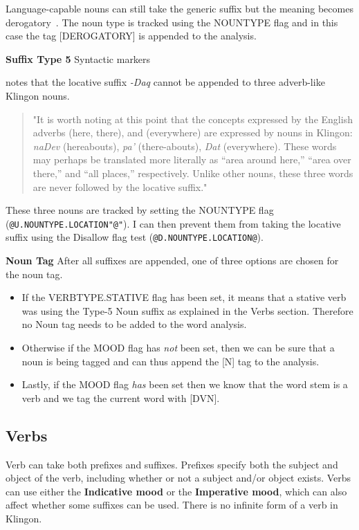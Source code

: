 \documentclass[11pt]{article}
\begin{document}
Language-capable nouns can still take the generic suffix but the meaning becomes derogatory~\cite{Okrand:92}. The noun type is tracked using the NOUNTYPE flag and in this case the tag [DEROGATORY] is appended to the analysis.

\textbf{Suffix Type 5} Syntactic markers

\cite{Okrand:92} notes that the locative suffix \textit{-Daq} cannot be appended to three adverb-like Klingon nouns.

\begin{quote}
"It is worth noting at this point that the concepts expressed by the English adverbs (here, there), and (everywhere) are expressed by nouns in Klingon: \textit{naDev} (hereabouts), \textit{pa'} (there-abouts), \textit{Dat} (everywhere). These words may perhaps be translated more literally as ``area around here,'' ``area over there,'' and ``all places,'' respectively. Unlike other nouns, these three words are never followed by the locative suffix."
\end{quote}

These three nouns are tracked by setting the NOUNTYPE flag (\texttt{@U.NOUNTYPE.LOCATION"@"}). I can then prevent them from taking the locative suffix using the Disallow flag test (\texttt{@D.NOUNTYPE.LOCATION@}).

\textbf{Noun Tag}
After all suffixes are appended, one of three options are chosen for the noun tag.
\begin{itemize}
	\item If the VERBTYPE.STATIVE flag has been set, it means that a stative verb was using the Type-5 Noun suffix as explained in the Verbs section. Therefore no Noun tag needs to be added to the word analysis.
	\item Otherwise if the MOOD flag has \textit{not} been set, then we can be sure that a noun is being tagged and can thus append the [N] tag to the analysis.
	\item Lastly, if the MOOD flag \textit{has} been set then we know that the word stem is a verb and we tag the current word with [DVN].
\end{itemize}

\subsection {Verbs}

Verb can take both prefixes and suffixes. Prefixes specify both the subject and object of the verb, including whether or not a subject and/or object exists. Verbs can use either the \textbf{Indicative mood} or the \textbf{Imperative mood}, which can also affect whether some suffixes can be used. There is no infinite form of a verb in Klingon.
\end{document}

